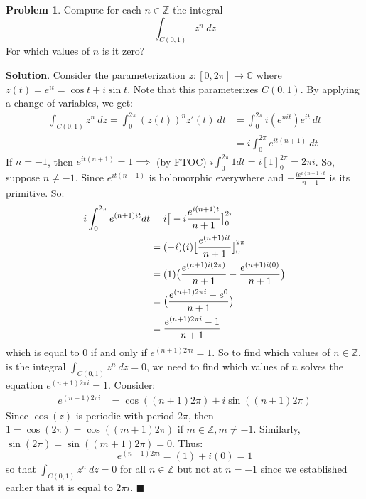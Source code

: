 \documentclass[12pt]{article}
\renewcommand{\=}[1]{\stackrel{#1}{=}} %
\providecommand{\ZZ}{\mathbb{Z}}
\theoremstyle{definition}
\newtheorem{p}{Problem}[section]
\theoremstyle{definition}
\newenvironment{s}{%
        \begin{trivlist} \item \textbf{Solution}. }{%
            \hspace*{\fill} $\blacksquare$\end{trivlist}}%
\begin{document}
\begin{p}
    Compute for each $n\in\ZZ$ the integral
    \[ \int_{C(0,1)} z^n\:dz \]
    For which values of $n$ is it zero?
\end{p}
\begin{s}
    Consider the parameterization $z:[0,2\pi]\to\mathbb{C}$ where $z(t) = e^{it} = \cos{t}+i\sin{t}$. Note that this
    parameterizes $C(0,1)$. By applying a change of variables, we get:
    \begin{align*}
        \int_{C(0,1)} z^n\:dz = \int_0^{2\pi} (z(t))^nz'(t)\:dt &= \int_0^{2\pi} i(e^{nit})e^{it}\:dt \\
        &= i\int_0^{2\pi} e^{it(n+1)}\:dt
    \end{align*}
    If $n=-1$, then $e^{it(n+1)}=1 \implies$ (by FTOC) $i\int_0^{2\pi} 1dt = i[1]_0^{2\pi} = 2\pi i$. 
    So, suppose $n\neq -1$.
    Since $e^{it(n+1)}$ is holomorphic everywhere and $-\frac{ie^{i(n+1)t}}{n+1}$ is its primitive. So:
    \begin{align*}
        i\int_0^{2\pi} e^{(n+1)it}dt &= i\big{[}-i\frac{e^{i(n+1)t}}{n+1}\big{]}_0^{2\pi} \\
        &= (-i)(i)\big{[}\frac{e^{(n+1)it}}{n+1}\big{]}_0^{2\pi} \\
        &= (1)\big{(}\frac{e^{(n+1)i(2\pi)}}{n+1} - \frac{e^{(n+1)i(0)}}{n+1}\big{)} \\
        &= \big{(}\frac{e^{(n+1)2\pi i} - e^0}{n+1}\big{)} \\
        &= \frac{e^{(n+1)2\pi i}-1}{n+1}
    \end{align*}
    which is equal to 0 if and only if $e^{(n+1)2\pi i} = 1$. So to find which values of $n\in\mathbb{Z}$,
    is the integral $\int_{C(0,1)} z^n\:dz = 0$,
    we need to find which values of $n$ solves the equation $e^{(n+1)2\pi i} = 1$. Consider:
    \begin{align*}
        e^{(n+1)2\pi i} &= \cos{((n+1)2\pi)} + i\sin{((n+1)2\pi)}
    \end{align*}
    Since $\cos{(z)}$ is periodic with period $2\pi$, then $1 = \cos{(2\pi)} = \cos{((m+1)2\pi)}$ if $m\in\mathbb{Z},m\neq -1$. 
    Similarly, $\sin{(2\pi)} = \sin{((m+1)2\pi)} = 0$. Thus:
    \[ e^{(n+1)2\pi i} = (1) + i(0) = 1 \]
    so that $\int_{C(0,1)} z^n\:dz = 0$ for all $n\in\mathbb{Z}$ but not at $n=-1$ since we established earlier that it is
    equal to $2\pi i$.
\end{s}
\end{document}
